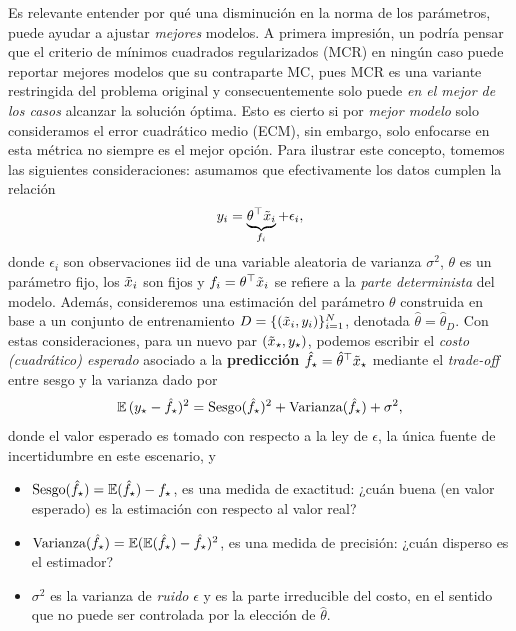 Es relevante entender por qué una disminución en la norma de los parámetros, puede ayudar a ajustar \emph{mejores} modelos. A primera impresión, un podría pensar que el criterio de mínimos cuadrados regularizados (MCR) en ningún caso puede reportar mejores modelos que su contraparte MC, pues MCR es una variante restringida del problema original y consecuentemente solo puede \emph{en el mejor de los casos} alcanzar la solución óptima. Esto es cierto si por \emph{mejor modelo} solo consideramos el error cuadrático medio (ECM), sin embargo, solo enfocarse en esta métrica no siempre es el mejor opción. Para ilustrar este concepto, tomemos las siguientes consideraciones: asumamos que efectivamente los datos cumplen la relación
\begin{equation}
	y_i = \underbrace{\theta^\top\tilde{x}_i}_{f_i} + \epsilon_i,	
 \end{equation}
 donde $\epsilon_i$ son observaciones iid de una variable aleatoria de varianza $\sigma^2$, $\theta$ es un parámetro fijo, los $\tilde{x}_i$ son fijos y $f_i= \theta^\top\tilde{x}_i$ se refiere a la  \emph{parte determinista} del modelo. Además, consideremos una estimación del parámetro $\theta$ construida en base a un conjunto de entrenamiento $D=\{(\tilde{x}_i,y_i)\}_{i=1}^N$, denotada $\hat\theta=\hat\theta_D$. Con estas consideraciones, para un nuevo par $(\tilde{x}_\star,y_\star)$, podemos escribir el \emph{costo (cuadrático) esperado} asociado a la \textbf{predicción} $\hat f_\star = \hat\theta^\top \tilde{x}_\star$ mediante el \emph{trade-off} entre sesgo y la varianza \cite{ISLbook} dado por
\begin{equation}
 	\operatorname{\mathbb{E}}{(y_\star - \hat f_\star)^2} = \text{Sesgo}(\hat f_\star)^2 + \text{Varianza}(\hat f_\star) + \sigma^2,\label{eq:expected_sq_loss}
 \end{equation} 
 donde el valor esperado es tomado con respecto a la ley de $\epsilon$, la única fuente de incertidumbre en este escenario, y 
 \begin{itemize}
 	\item $\text{Sesgo}(\hat f_\star) = \operatorname{\mathbb{E}}(\hat f_\star) - f_\star$, es una medida de exactitud: ¿cuán buena (en valor esperado) es la estimación con respecto al valor real?
 	\item $\text{Varianza}(\hat f_\star)= \operatorname{\mathbb{E}}(\operatorname{\mathbb{E}}(\hat f_\star)- \hat f_\star)^2$, es una medida de precisión: ¿cuán disperso es el estimador?
 	\item $\sigma^2$ es la varianza de \emph{ruido} $\epsilon$ y es la parte irreducible del costo, en el sentido que no puede ser controlada por la elección de $\hat\theta$.
 \end{itemize}

